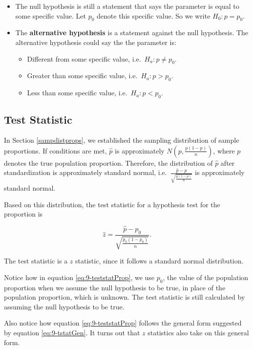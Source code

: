 \documentclass[
]{book}
\begin{document}
\begin{itemize}
\item
  The null hypothesis is still a statement that says the parameter is equal to some specific value. Let \(p_0\) denote this specific value. So we write \(H_0: p = p_0\).
\item
  The \textbf{alternative hypothesis} is a statement against the null hypothesis. The alternative hypothesis could say the the parameter is:

  \begin{itemize}
  \item
    Different from some specific value, i.e.~\(H_a: p \neq p_0\).
  \item
    Greater than some specific value, i.e.~\(H_a: p > p_0\).
  \item
    Less than some specific value, i.e.~\(H_a: p < p_0\).
  \end{itemize}
\end{itemize}

\subsection{Test Statistic}\label{test-statistic-1}

In Section \ref{sampdistprops}, we established the sampling distribution of sample proportions. If conditions are met, \(\hat{p}\) is approximately \(N\left(p, \frac{p(1-p)}{n}\right)\), where \(p\) denotes the true population proportion. Therefore, the distribution of \(\hat{p}\) after standardization is approximately standard normal, i.e.~\(\frac{\hat{p}-p}{\sqrt{\frac{p(1-p)}{n}}}\) is approximately standard normal.

Based on this distribution, the test statistic for a hypothesis test for the proportion is

\begin{equation} 
\hat{z} =  \frac{\hat{p} - p_0}{\sqrt{\frac{p_0(1-p_0)}{n}}} .
\label{eq:9-teststatProp}
\end{equation}

The test statistic is a \(z\) statistic, since it follows a standard normal distribution.

Notice how in equation \eqref{eq:9-teststatProp}, we use \(p_0\), the value of the population proportion when we assume the null hypothesis to be true, in place of the population proportion, which is unknown. The test statistic is still calculated by assuming the null hypothesis to be true.

Also notice how equation \eqref{eq:9-teststatProp} follows the general form suggested by equation \eqref{eq:9-tstatGen}. It turns out that \(z\) statistics also take on this general form.
\end{document}
